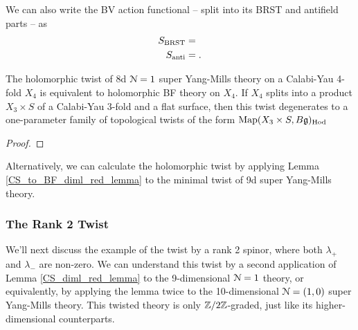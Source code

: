 \documentclass[10pt, oneside]{article}
\begin{document}
We can also write the BV action functional -- split into its BRST and antifield parts -- as
\begin{align*}
S_{\mathrm{BRST}} &= \\ 
S_{\mathrm{anti}} &= .
\end{align*}


\begin{theorem} \label{8d_holo_twist_thm}
The holomorphic twist of 8d $\mathcal{N}=1$ super Yang-Mills theory on a Calabi-Yau 4-fold $X_4$ is equivalent to holomorphic BF theory on $X_4$. If $X_4$ splits into a product $X_3 \times S$ of a Calabi-Yau 3-fold and a flat surface, then this twist degenerates to a one-parameter family of topological twists of the form $\operatorname{Map}(X_3 \times S, B\mathfrak{g})_{\mathrm{Hod}}$
\end{theorem}

\begin{proof}
\end{proof}

\begin{remark}
Alternatively, we can calculate the holomorphic twist by applying Lemma \ref{CS_to_BF_diml_red_lemma} to the minimal twist of 9d super Yang-Mills theory.
\end{remark}

\subsubsection{The Rank 2 Twist}
We'll next discuss the example of the twist by a rank 2 spinor, where both $\lambda_+$ and $\lambda_-$ are non-zero.  We can understand this twist by a second application of Lemma \ref{CS_diml_red_lemma} to the 9-dimensional $\mathcal{N}=1$ theory, or equivalently, by applying the lemma twice to the 10-dimensional $\mathcal{N}=(1,0)$ super Yang-Mills theory.  This twisted theory is only $\mathbb Z/2\mathbb Z$-graded, just like its higher-dimensional counterparts.
\end{document}

